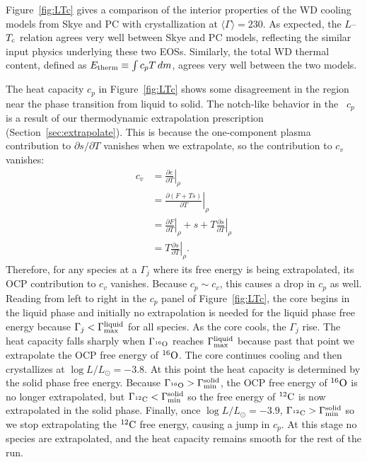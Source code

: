 Figure~\ref{fig:LTc} gives a comparison of the interior properties of
the WD cooling models from Skye and PC with crystallization at $\langle \Gamma \rangle = 230$.
As expected, the $L$--$T_{\rm c}$ relation agrees very well between Skye
and PC models, reflecting the similar input physics underlying these
two EOSs. Similarly, the total WD thermal content, defined as
$E_{\rm therm} \equiv \int c_p T \, dm$, agrees very well between the
two models.

The heat capacity $c_p$ in Figure~\ref{fig:LTc} shows some
disagreement in the region near the phase transition from liquid to solid.
The notch-like behavior in the \skye\ $c_p$ is a result of our thermodynamic extrapolation prescription (Section~\ref{sec:extrapolate}).
This is because the one-component plasma contribution to $\partial s/\partial T$ vanishes when we extrapolate, so the contribution to $c_v$ vanishes:
\begin{align}
	c_v &=  \left.\frac{\partial e}{\partial T}\right|_{\rho}\nonumber\\
	&= \left.\frac{\partial (F+Ts)}{\partial T}\right|_{\rho}\nonumber\\
	&= \left.\frac{\partial F}{\partial T}\right|_{\rho} + s + T\left.\frac{\partial s}{\partial T}\right|_{\rho}\nonumber\\
	&= T\left.\frac{\partial s}{\partial T}\right|_{\rho}.
\end{align}
Therefore, for any species at a $\Gamma_j$ where its free energy is being extrapolated, its OCP contribution to $c_v$ vanishes.
Because $c_p \sim c_v$, this causes a drop in $c_p$ as well.
Reading from left to right in the $c_p$ panel of Figure~\ref{fig:LTc}, the core begins in the liquid phase and initially no extrapolation is needed for the liquid phase free energy because $\Gamma_j < \Gamma_{\rm max}^{\rm liquid}$ for all species.
As the core cools, the $\Gamma_j$ rise.
The heat capacity falls sharply when $\Gamma_{^{16}\rm O}$ reaches $\Gamma_{\rm max}^{\rm liquid}$ because past that point we extrapolate the OCP free energy of $^{16}\rm O$.
The core continues cooling and then crystallizes at $\log L/L_\odot = -3.8$.
At this point the heat capacity is determined by the solid phase free energy.
Because  $\Gamma_{^{16}\rm O} > \Gamma_{\rm min}^{\rm solid}$, the OCP free energy of $^{16}\rm O$ is no longer extrapolated, but $\Gamma_{^{12}\rm C} < \Gamma_{\rm min}^{\rm solid}$ so the free energy of $^{12}\rm C$ is now extrapolated in the solid phase.
Finally, once $\log L/L_\odot = -3.9$, $\Gamma_{^{12}\rm C} > \Gamma_{\rm min}^{\rm solid}$ so we stop extrapolating the $^{12}\rm C$ free energy, causing a jump in $c_p$.
At this stage no species are extrapolated, and the heat capacity remains smooth for the rest of the run.

